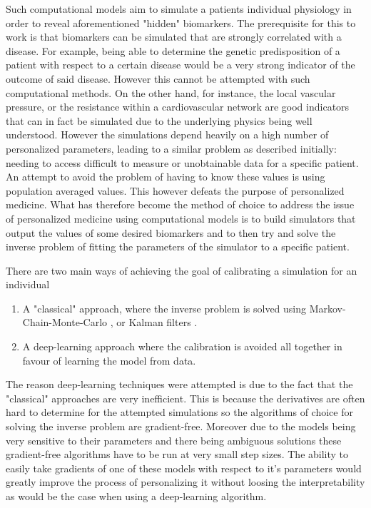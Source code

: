 \documentclass[a4paper, oneside]{discothesis}
\begin{document}
Such computational models aim to simulate a patients individual physiology in order to reveal aforementioned "hidden" biomarkers.
The prerequisite for this to work is that biomarkers can be simulated that are strongly correlated with a disease.
For example, being able to determine the genetic predisposition of a patient with respect to a certain disease would be a very strong indicator of the outcome of said disease.
However this cannot be attempted with such computational methods.
On the other hand, for instance, the local vascular pressure, or the resistance within a cardiovascular network are good indicators that can in fact be simulated due to the underlying physics being well understood.
However the simulations depend heavily on a high number of personalized parameters, leading to a similar problem as described initially: needing to access difficult to measure or unobtainable data for a specific patient.
An attempt to avoid the problem of having to know these values is using population averaged values.
This however defeats the purpose of personalized medicine.
What has therefore become the method of choice to address the issue of personalized medicine using computational models is to build simulators that output the values of some desired biomarkers and to then try and solve the inverse problem of fitting the parameters of the simulator to a specific patient.

There are two main ways of achieving the goal of calibrating a simulation for an individual
\begin{enumerate}
	\item A "classical" approach, where the inverse problem is solved using Markov-Chain-Monte-Carlo \cite{melis2017gaussian}, or Kalman filters \cite{manganotti2022modeling}.
	\item A deep-learning approach where the calibration is avoided all together in favour of learning the model from data. \cite{kissas2020machine,arzani2022machine}
\end{enumerate}
The reason deep-learning techniques were attempted is due to the fact that the "classical" approaches are very inefficient.
This is because the derivatives are often hard to determine for the attempted simulations so the algorithms of choice for solving the inverse problem are gradient-free. 
Moreover due to the models being very sensitive to their parameters and there being ambiguous solutions \cite{nolte2022inverse,quick2001infinite} these gradient-free algorithms have to be run at very small step sizes. \cite{taylor2009patient,tuccio2022parameter,marsden2014optimization,mineroff2019optimization,bozkurt2022patient}
The ability to easily take gradients of one of these models with respect to it's parameters would greatly improve the process of personalizing it without loosing the interpretability as would be the case when using a deep-learning algorithm.
\end{document}
